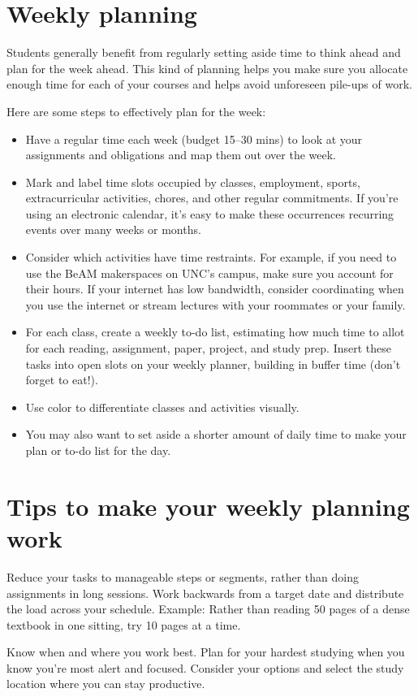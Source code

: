 \documentclass[../main.tex]{subfiles}
\begin{document}
\section{Weekly planning}
Students generally benefit from regularly setting aside time to think ahead and
plan for the week ahead. This kind of planning helps you make sure you allocate
enough time for each of your courses and helps avoid unforeseen pile-ups of
work.

Here are some steps to effectively plan for the week:
\begin{itemize}
  \item Have a regular time each week (budget 15–30 mins) to look at your
    assignments and obligations and map them out over the week.
  \item Mark and label time slots occupied by classes, employment, sports,
    extracurricular activities, chores, and other regular commitments. If you’re
    using an electronic calendar, it’s easy to make these occurrences recurring
    events over many weeks or months.
  \item Consider which activities have time restraints. For example, if you need
    to use the BeAM makerspaces on UNC’s campus, make sure you account for their
    hours. If your internet has low bandwidth, consider coordinating when you
    use the internet or stream lectures with your roommates or your family.
  \item For each class, create a weekly to-do list, estimating how much time to
    allot for each reading, assignment, paper, project, and study prep. Insert
    these tasks into open slots on your weekly planner, building in buffer time
    (don’t forget to eat!).
  \item Use color to differentiate classes and activities visually.
  \item You may also want to set aside a shorter amount of daily time to make
    your plan or to-do list for the day.
\end{itemize}
%
\section{Tips to make your weekly planning work}
Reduce your tasks to manageable steps or segments, rather than doing assignments
in long sessions. Work backwards from a target date and distribute the load
across your schedule. Example: Rather than reading 50 pages of a dense textbook
in one sitting, try 10 pages at a time.

Know when and where you work best. Plan for your hardest studying when you know
you’re most alert and focused. Consider your options and select the study
location where you can stay productive.
\end{document}
